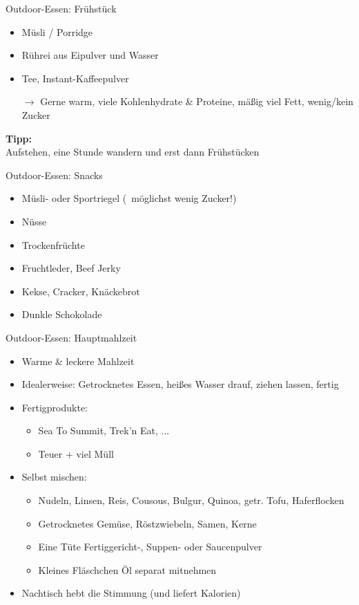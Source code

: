 \documentclass[aspectratio=169]{beamer}
\newcommand{\sarrow}{\small$\rightarrow$}
\newcommand{\tipp}[2][Tipp]{\vspace{0.2cm}\textbf{#1:}\\#2}
\begin{document}
			\begin{frame}{Outdoor-Essen: Frühstück}
				\begin{itemize}
					\item Müsli / Porridge
					\item Rührei aus Eipulver und Wasser
					\item Tee, Instant-Kaffeepulver
					\item[\sarrow] Gerne warm, viele Kohlenhydrate \& Proteine, mäßig viel Fett, wenig/kein Zucker
				\end{itemize}\pause
				\tipp{Aufstehen, eine Stunde wandern und erst dann Frühstücken}\\\pause
			\end{frame}
			
			\begin{frame}{Outdoor-Essen: Snacks}
				\begin{itemize}
					\item Müsli- oder Sportriegel (\textrightarrow\ möglichst wenig Zucker!)
					\item Nüsse
					\item Trockenfrüchte
					\item Fruchtleder, Beef Jerky
					\item Kekse, Cracker, Knäckebrot
					\item Dunkle Schokolade
				\end{itemize}
			\end{frame}
			
			\begin{frame}{Outdoor-Essen: Hauptmahlzeit}
				\begin{itemize}
					\item Warme \& leckere Mahlzeit
					\item Idealerweise: Getrocknetes Essen, heißes Wasser drauf, ziehen lassen, fertig\pause
					\item Fertigprodukte:
					\begin{itemize}
						\item Sea To Summit, Trek'n Eat, ...
						\item Teuer + viel Müll
					\end{itemize}\pause
					\item Selbst mischen:
					\begin{itemize}
						\item Nudeln, Linsen, Reis, Cousous, Bulgur, Quinoa, getr. Tofu, Haferflocken
						\item Getrocknetes Gemüse, Röstzwiebeln, Samen, Kerne
						\item Eine Tüte Fertiggericht-, Suppen- oder Saucenpulver
						\item Kleines Fläschchen Öl separat mitnehmen
					\end{itemize}
					\item Nachtisch hebt die Stimmung (und liefert Kalorien)
				\end{itemize}
			\end{frame}
			
\end{document}
